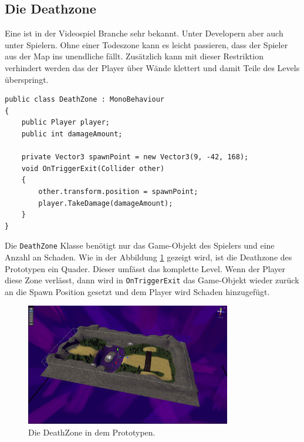 \pagebreak

\subsection{Die Deathzone}
Eine  ist in der Videospiel Branche sehr bekannt. Unter Developern aber auch unter Spielern. Ohne einer Todeszone kann es leicht passieren, dass der Spieler aus der Map ins unendliche fällt. Zusätzlich kann mit dieser Restriktion verhindert werden das der Player über Wände klettert und damit Teile des Levels überspringt.\\

\begin{lstlisting}[language=CSharp,caption={DeathZone Klasse},label=code:deathzone]
public class DeathZone : MonoBehaviour
{
    public Player player;
    public int damageAmount;

    private Vector3 spawnPoint = new Vector3(9, -42, 168);
    void OnTriggerExit(Collider other)
    {
        other.transform.position = spawnPoint;
        player.TakeDamage(damageAmount);
    }
}
\end{lstlisting}

Die \verb+DeathZone+ Klasse benötigt nur das Game-Objekt des Spielers und eine Anzahl an Schaden. Wie in der Abbildung \ref{SD02} gezeigt wird, ist die Deathzone des Prototypen ein Quader. Dieser umfässt das komplette Level. Wenn der Player diese Zone verlässt, dann wird in \verb+OnTriggerExit+ das Game-Objekt wieder zurück an die Spawn Position gesetzt und dem Player wird Schaden hinzugefügt.

\begin{figure}[H]
    \centering
    \includegraphics[width=0.8\textwidth]{chapters/05/images/DeathZone.png}
    \caption{Die DeathZone in dem Prototypen.}
    \label{SD02}
\end{figure}
\pagebreak


